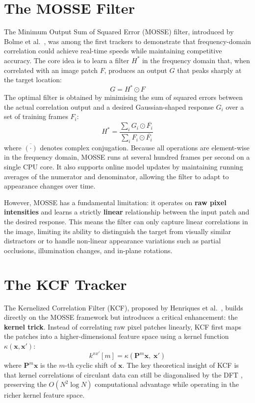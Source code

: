 \documentclass[a4paper,12pt]{report}
\begin{document}
\section{The MOSSE Filter}
The Minimum Output Sum of Squared Error (MOSSE) filter, introduced by Bolme et al.\ \cite{bolme2010}, was among the first trackers to demonstrate that frequency-domain correlation could achieve real-time speeds while maintaining competitive accuracy. The core idea is to learn a filter $H^{*}$ in the frequency domain that, when correlated with an image patch $F$, produces an output $G$ that peaks sharply at the target location:
\begin{equation}
    G = H^{*} \odot F
    \label{eq_mosse}
\end{equation}
The optimal filter is obtained by minimising the sum of squared errors between the actual correlation output and a desired Gaussian-shaped response $G_i$ over a set of training frames $F_i$:
\begin{equation}
    H^{*} = \frac{\sum_i G_i \odot \overline{F_i}}{\sum_i F_i \odot \overline{F_i}}
    \label{eq_mosse_filter}
\end{equation}
where $\overline{(\cdot)}$ denotes complex conjugation. Because all operations are element-wise in the frequency domain, MOSSE runs at several hundred frames per second on a single CPU core. It also supports online model updates by maintaining running averages of the numerator and denominator, allowing the filter to adapt to appearance changes over time.

However, MOSSE has a fundamental limitation: it operates on \textbf{raw pixel intensities} and learns a strictly \textbf{linear} relationship between the input patch and the desired response. This means the filter can only capture linear correlations in the image, limiting its ability to distinguish the target from visually similar distractors or to handle non-linear appearance variations such as partial occlusions, illumination changes, and in-plane rotations.

\section{The KCF Tracker}
The Kernelized Correlation Filter (KCF), proposed by Henriques et al.\ \cite{henriques2015}, builds directly on the MOSSE framework but introduces a critical enhancement: the \textbf{kernel trick}. Instead of correlating raw pixel patches linearly, KCF first maps the patches into a higher-dimensional feature space using a kernel function $\kappa(\mathbf{x}, \mathbf{x}')$:
\begin{equation}
    k^{xx'}[m] = \kappa\!\left(\mathbf{P}^m \mathbf{x},\; \mathbf{x}'\right)
    \label{eq_kernel}
\end{equation}
where $\mathbf{P}^m \mathbf{x}$ is the $m$-th cyclic shift of $\mathbf{x}$. The key theoretical insight of KCF is that kernel correlations of circulant data can still be diagonalised by the DFT \cite{henriques2015}, preserving the $O(N^2 \log N)$ computational advantage while operating in the richer kernel feature space.
\end{document}

